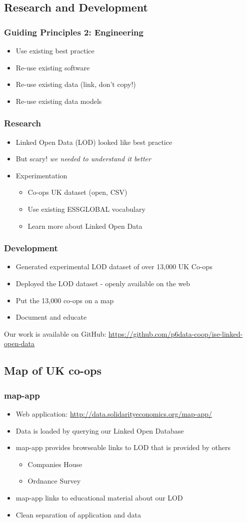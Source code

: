 \subsection{Research and Development}
\frame
{
  \frametitle{Guiding Principles 2: Engineering}
  \begin{itemize}
    \item Use existing best practice
    \item Re-use existing software
    \item Re-use existing data (link, don't copy!)
    \item Re-use existing data models
  \end{itemize}
}
\frame
{
  \frametitle{Research}
  \begin{itemize}
    \item<1-> Linked Open Data (LOD) looked like best practice
    \item<1-> But scary! {\em we needed to understand it better}
    \item<2-> Experimentation
      \begin{itemize}
	\item Co-ops UK dataset (open, CSV)
	\item Use existing ESSGLOBAL vocabulary
	\item Learn more about Linked Open Data
      \end{itemize}
  \end{itemize}
}
\frame
{
  \frametitle{Development}
  \begin{itemize}
    \item Generated experimental LOD dataset of over 13,000 UK Co-ops
    \item Deployed the LOD dataset - openly available on the web
    \item Put the 13,000 co-ops on a map
    \item Document and educate
  \end{itemize}
}
Our work is available on GitHub: \url{https://github.com/p6data-coop/ise-linked-open-data}
\subsection{Map of UK co-ops}
\frame
{
  \frametitle{map-app}
  \begin{itemize}
    \item<1-> Web application: \url{http://data.solidarityeconomics.org/map-app/}
    \item<2-> Data is loaded by querying our Linked Open Database
    \item<3-> map-app provides browseable links to LOD that is provided by others
      \begin{itemize}
	\item<3-> Companies House
	\item<3-> Ordnance Survey
      \end{itemize}
    \item<4-> map-app links to educational material about our LOD
    \item<article> Clean separation of application and data
  \end{itemize}
}

